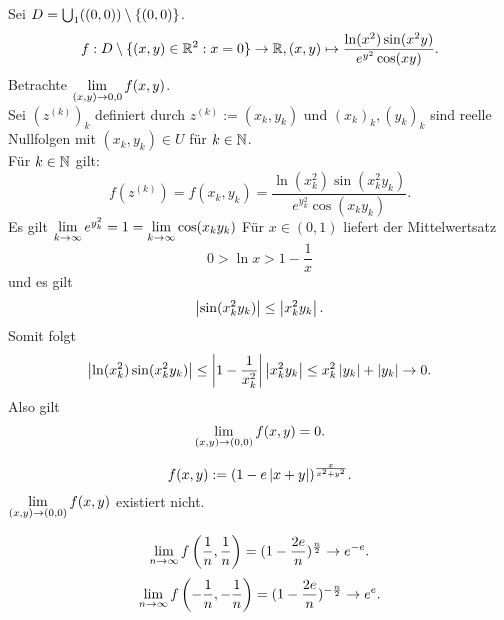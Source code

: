 \documentclass[../ana2u.tex]{subfiles}
\begin{document}
\begin{bsp}
    Sei \( D = \bigcup_1( (0,0) ) \setminus \{(0,0)\} \).
    \[ f:D \setminus \{(x,y) \in \mathbb{R}^2: x = 0 \} \rightarrow \mathbb{R}, 
    (x,y) \mapsto \frac{ \ln (x^2) \sin(x^2 y) }{ 
        e^{y^2} \cos(xy) }. \]
    Betrachte \( \lim\limits_{(x,y)\rightarrow{}0,0} f(x,y) \). \\
    Sei \( (z^{(k)})_k \) definiert durch 
    \( z^{(k)} := (x_k, y_k) \)
    und \( (x_k)_k, (y_k)_k \) sind reelle 
    Nullfolgen mit \( (x_k, y_k) \in U \)
    für \(k \in \mathbb{N}\).\\
    Für \(k \in \mathbb{N}\) gilt:
    \[ f(z^{(k)}) = f(x_k, y_k) 
    = \frac{ \ln(x_k^2) \sin(x_k^2 y_k) }{ 
        e^{y_k^2} \cos(x_k y_k) }. \]
    Es gilt \( \lim\limits_{k\rightarrow\infty} e^{y_k^2} = 1 
    = \lim\limits_{k\rightarrow\infty} \cos(x_k y_k) \)
    Für \( x \in (0,1) \) liefert der Mittelwertsatz 
    \[ 0 > \ln x > 1 - \frac{1}{x} \]
    und es gilt
    \[ \left| \sin(x_k^2 y_k) \right| \leq \left| x_k^2 y_k \right|. \]
    Somit folgt 
    \[ \left|\ln(x_k^2) \sin(x_k^2 y_k)\right| 
    \leq \left| 1 - \frac{1}{x_k^2} \right|\left|x_k^2 y_k\right| 
    \leq x_k^2 \left|y_k\right| + \left|y_k\right| \rightarrow 0. \]
    Also gilt 
    \[ \lim\limits_{(x,y)\rightarrow{}(0,0)} f(x,y) = 0. \]
\end{bsp}
\begin{bsp}
    \[ f(x,y) := (1-e\left|x+y\right|)^{\frac{x}{x^2+y^2}}. \]
    \( \lim\limits_{(x,y)\rightarrow{}(0,0)} f(x,y) \) existiert nicht.
\end{bsp}
\begin{bew}
    \[ \lim\limits_{n\rightarrow\infty} f\left(\frac{1}{n}, \frac{1}{n}\right) 
    = (1 - \frac{2e}{n})^\frac{n}{2} \rightarrow e^{-e}. \]
    \[ \lim\limits_{n\rightarrow\infty} f\left(-\frac{1}{n}, -\frac{1}{n}\right) 
    = (1 - \frac{2e}{n})^{-\frac{n}{2}} \rightarrow e^e. \]
\end{bew}
\end{document}

